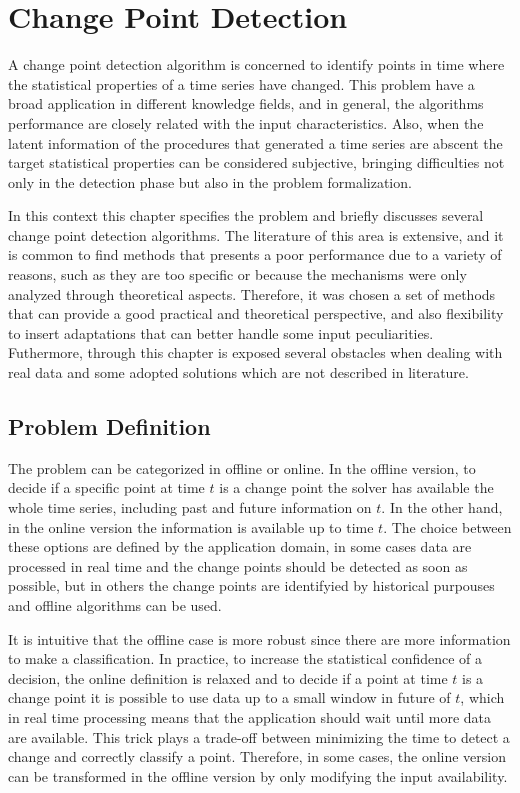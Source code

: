 \chapter{Change Point Detection} 

A change point detection algorithm is concerned to identify points in time where the statistical properties of a time series have changed. This problem have a broad application in different knowledge fields, and in general, the algorithms performance are closely related with the input characteristics. Also, when the latent information of the procedures that generated a time series are abscent the target statistical properties can be considered subjective, bringing difficulties not only in the detection phase but also in the problem formalization.

In this context this chapter specifies the problem and briefly discusses several change point detection algorithms. The literature of this area is extensive, and it is common to find methods that presents a poor performance due to a variety of reasons, such as they are too specific or because the mechanisms were only analyzed through theoretical aspects. Therefore, it was chosen a set of methods that can provide a good practical and theoretical perspective, and also flexibility to insert adaptations that can better handle some input peculiarities. Futhermore, through this chapter is exposed several obstacles when dealing with real data and some adopted solutions which are not described in literature.

\section{Problem Definition}

The problem can be categorized in offline or online. In the offline version, to decide if a specific point at time $t$ is a change point the solver has available the whole time series, including past and future information on $t$. In the other hand, in the online version the information is available up to time $t$. The choice between these options are defined by the application domain, in some cases data are processed in real time and the change points should be detected as soon as possible, but in others the change points are identifyied by historical purpouses and offline algorithms can be used. 

It is intuitive that the offline case is more robust since there are more information to make a classification. In practice, to increase the statistical confidence of a decision, the online definition is relaxed and to decide if a point at time $t$ is a change point it is possible to use data up to a small window in future of $t$, which in real time processing means that the application should wait until more data are available. This trick plays a trade-off between minimizing the time to detect a change and correctly classify a point. Therefore, in some cases, the online version can be transformed in the offline version by only modifying the input availability. 

